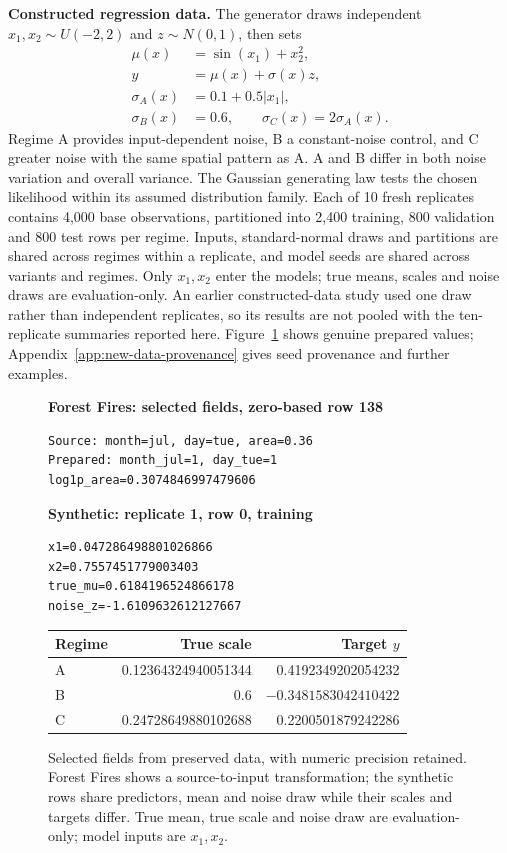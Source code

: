 \textbf{Constructed regression data.}
The generator draws independent $x_1,x_2\sim U(-2,2)$ and $z\sim N(0,1)$, then sets
\begin{align*}
\mu(x)&=\sin(x_1)+x_2^2,\\
y&=\mu(x)+\sigma(x)z,\\
\sigma_A(x)&=0.1+0.5|x_1|,\\
\sigma_B(x)&=0.6,\qquad \sigma_C(x)=2\sigma_A(x).
\end{align*}
Regime A provides input-dependent noise, B a constant-noise control, and C greater noise with the same spatial pattern as A.
A and B differ in both noise variation and overall variance.
The Gaussian generating law tests the chosen likelihood within its assumed distribution family.
Each of 10 fresh replicates contains 4{,}000 base observations, partitioned into 2{,}400 training, 800 validation and 800 test rows per regime.
Inputs, standard-normal draws and partitions are shared across regimes within a replicate, and model seeds are shared across variants and regimes.
Only $x_1,x_2$ enter the models; true means, scales and noise draws are evaluation-only.
An earlier constructed-data study used one draw rather than independent replicates, so its results are not pooled with the ten-replicate summaries reported here.
Figure~\ref{fig:new-data-snippets} shows genuine prepared values; Appendix~\ref{app:new-data-provenance} gives seed provenance and further examples.

\begin{figure}[t]
\centering
\begin{minipage}{\columnwidth}
\footnotesize
\textbf{Forest Fires: selected fields, zero-based row 138}
\begin{verbatim}
Source: month=jul, day=tue, area=0.36
Prepared: month_jul=1, day_tue=1
log1p_area=0.3074846997479606
\end{verbatim}
\textbf{Synthetic: replicate 1, row 0, training}
\begin{verbatim}
x1=0.047286498801026866
x2=0.7557451779003403
true_mu=0.6184196524866178
noise_z=-1.6109632612127667
\end{verbatim}
\centering
\setlength{\tabcolsep}{3pt}
\begin{tabular}{@{}lrr@{}}
\toprule
Regime & True scale & Target $y$ \\
\midrule
A & 0.12364324940051344 & 0.4192349202054232 \\
B & 0.6 & $-0.3481583042410422$ \\
C & 0.24728649880102688 & 0.2200501879242286 \\
\bottomrule
\end{tabular}
\end{minipage}
\caption{Selected fields from preserved data, with numeric precision retained.
Forest Fires shows a source-to-input transformation; the synthetic rows share predictors, mean and noise draw while their scales and targets differ.
True mean, true scale and noise draw are evaluation-only; model inputs are $x_1,x_2$.}
\label{fig:new-data-snippets}
\end{figure}

